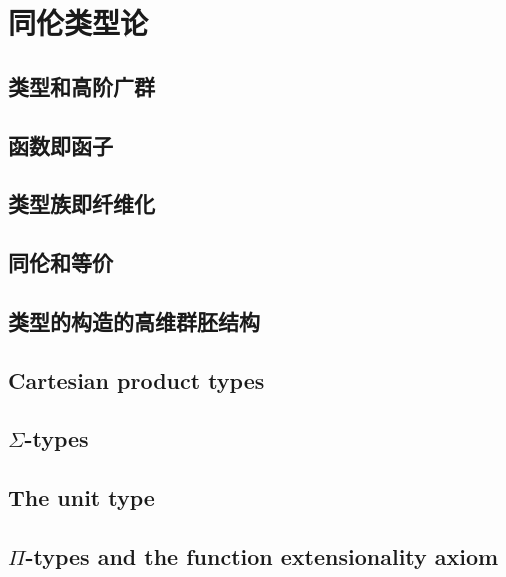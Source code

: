 \chapter{同伦类型论}
\label{cha:basics}


\section{类型和高阶广群}
\label{sec:equality}


\section{函数即函子}
\label{sec:functors}


\section{类型族即纤维化}
\label{sec:fibrations}


\section{同伦和等价}
\label{sec:basics-equivalences}


\section{类型的构造的高维群胚结构}
\label{sec:computational}


\section{Cartesian product types}
\label{sec:compute-cartprod}


\section{\texorpdfstring{$\Sigma$}{Σ}-types}
\label{sec:compute-sigma}


\section{The unit type}
\label{sec:compute-unit}


\section{\texorpdfstring{$\Pi$}{Π}-types and the function extensionality axiom}
\label{sec:compute-pi}


